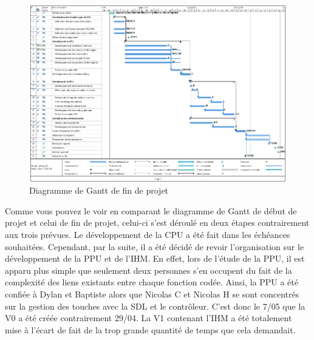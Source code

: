 \begin{figure}[h]
  \centering
   \includegraphics[scale=0.45]{GantV2.png}
   \caption{Diagramme de Gantt de fin de projet}
\end{figure}

Comme vous pouvez le voir en comparant le diagramme de Gantt de début de projet et celui de fin de projet, celui-ci s'est déroulé en deux étapes contrairement aux trois prévues. Le développement de la CPU a été fait dans les échéances souhaitées. Cependant, par la suite, il a été décidé de revoir l'organisation sur le développement de la PPU et de l'IHM. En effet, lors de l'étude de la PPU, il est apparu plus simple que seulement deux personnes s'en occupent du fait de la complexité des liens existants entre chaque fonction codée. Ainsi, la PPU a été confiée à Dylan et Baptiste alors que Nicolas C et Nicolas H se sont concentrés sur la gestion des touches avec la SDL et le contrôleur. C'est donc le 7/05 que la V0 a été créée contrairement 29/04. La V1 contenant l'IHM a été totalement mise à l'écart de fait de la trop grande quantité de temps que cela demandait.
